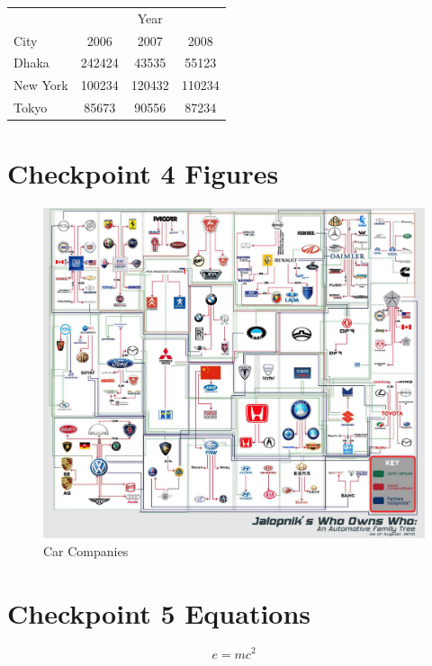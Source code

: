 \documentclass[a4paper,12pt]{article}
\begin{document}
\vspace{24pt}

\begin{tabular}{l|ccc}
    &\multicolumn{3}{c}{Year}\\
    \cline{2-4}
    City&2006&2007&2008\\
    \hline
    Dhaka & 242424 & 43535 & 55123\\
    New York & 100234 & 120432 & 110234\\
    Tokyo & 85673 & 90556 & 87234\\
\end{tabular}

\newpage

\section{Checkpoint 4 Figures}
\begin{figure}[h!]
    \centering
    \includegraphics[scale =0.25]{image102.pdf}
    \caption{Car Companies}
\end{figure}

\newpage

\section{Checkpoint 5 Equations}
\vspace{12pt}

\begin{equation}
    e = mc^2
\end{equation}
\end{document}
